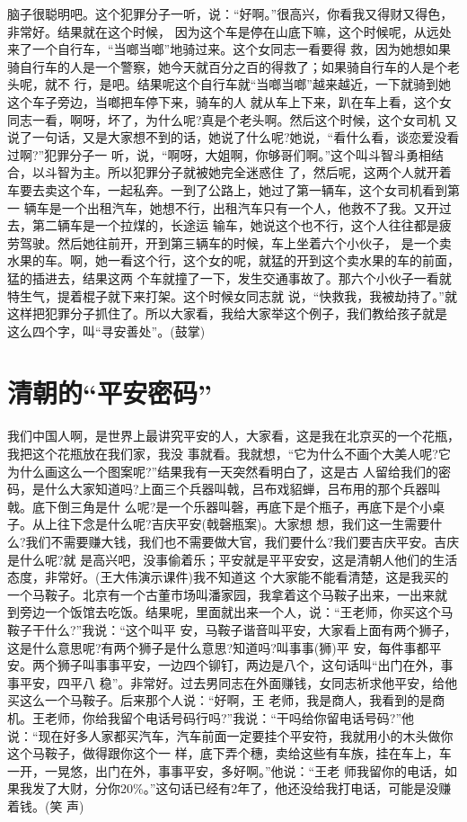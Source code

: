\documentclass[11pt,a4paper,onecolumn]{article}
\begin{document}
脑子很聪明吧。这个犯罪分子一听，说：``好啊。''很高兴，你看我又得财又得色，非常好。结果就在这个时候，
因为这个车是停在山底下嘛，这个时候呢，从远处来了一个自行车，``当啷当啷''地骑过来。这个女同志一看要得
救，因为她想如果骑自行车的人是一个警察，她今天就百分之百的得救了；如果骑自行车的人是个老头呢，就不
行，是吧。结果呢这个自行车就``当啷当啷''越来越近，一下就骑到她这个车子旁边，当啷把车停下来，骑车的人
就从车上下来，趴在车上看，这个女同志一看，啊呀，坏了，为什么呢?真是个老头啊。然后这个时候，这个女司机
又说了一句话，又是大家想不到的话，她说了什么呢?她说，``看什么看，谈恋爱没看过啊?''犯罪分子一
听，说，``啊呀，大姐啊，你够哥们啊。''这个叫斗智斗勇相结合，以斗智为主。所以犯罪分子就被她完全迷惑住
了，然后呢，这两个人就开着车要去卖这个车，一起私奔。一到了公路上，她过了第一辆车，这个女司机看到第一
辆车是一个出租汽车，她想不行，出租汽车只有一个人，他救不了我。又开过去，第二辆车是一个拉煤的，长途运
输车，她说这个也不行，这个人往往都是疲劳驾驶。然后她往前开，开到第三辆车的时候，车上坐着六个小伙子，
是一个卖水果的车。啊，她一看这个行，这个女的呢，就猛的开到这个卖水果的车的前面，猛的插进去，结果这两
个车就撞了一下，发生交通事故了。那六个小伙子一看就特生气，提着棍子就下来打架。这个时候女同志就
说，``快救我，我被劫持了。''就这样把犯罪分子抓住了。所以大家看，我给大家举这个例子，我们教给孩子就是
这么四个字，叫``寻安善处''。(鼓掌)


\section{清朝的``平安密码''}


我们中国人啊，是世界上最讲究平安的人，大家看，这是我在北京买的一个花瓶，我把这个花瓶放在我们家，我没
事就看。我就想，``它为什么不画个大美人呢?它为什么画这么一个图案呢?''结果我有一天突然看明白了，这是古
人留给我们的密码，是什么大家知道吗?上面三个兵器叫戟，吕布戏貂蝉，吕布用的那个兵器叫戟。底下倒三角是什
么呢?是一个乐器叫磬，再底下是个瓶子，再底下是个小桌子。从上往下念是什么呢?吉庆平安(戟磬瓶案)。大家想
想，我们这一生需要什么?我们不需要赚大钱，我们也不需要做大官，我们要什么?我们要吉庆平安。吉庆是什么呢?就
是高兴吧，没事偷着乐；平安就是平平安安，这是清朝人他们的生活态度，非常好。(王大伟演示课件)我不知道这
个大家能不能看清楚，这是我买的一个马鞍子。北京有一个古董市场叫潘家园，我拿着这个马鞍子出来，一出来就
到旁边一个饭馆去吃饭。结果呢，里面就出来一个人，说：``王老师，你买这个马鞍子干什么?''我说：``这个叫平
安，马鞍子谐音叫平安，大家看上面有两个狮子，这是什么意思呢?有两个狮子是什么意思?知道吗?叫事事(狮)平
安，每件事都平安。两个狮子叫事事平安，一边四个铆钉，两边是八个，这句话叫``出门在外，事事平安，四平八
稳''。非常好。过去男同志在外面赚钱，女同志祈求他平安，给他买这么一个马鞍子。后来那个人说：``好啊，王
老师，我是商人，我看到的是商机。王老师，你给我留个电话号码行吗?''我说：``干吗给你留电话号码?''他
说：``现在好多人家都买汽车，汽车前面一定要挂个平安符，我就用小的木头做你这个马鞍子，做得跟你这个一
样，底下弄个穗，卖给这些有车族，挂在车上，车一开，一晃悠，出门在外，事事平安，多好啊。''他说：``王老
师我留你的电话，如果我发了大财，分你20\%。''这句话已经有2年了，他还没给我打电话，可能是没赚着钱。(笑
声)
\end{document}
